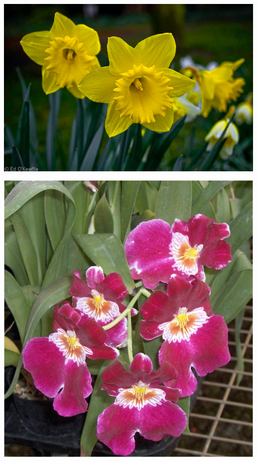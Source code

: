 \documentclass{article}
\begin{document}
\begin{center}
\includegraphics[height=0.9\textheight, angle=90]{../Narcissus_(Daffodil).jpg}
\end{center}
\newpage

\begin{center}
\includegraphics[height=0.9\textheight, angle=90]{../Orchid_Miltonia.jpg}
\end{center}
\newpage
\end{document}
